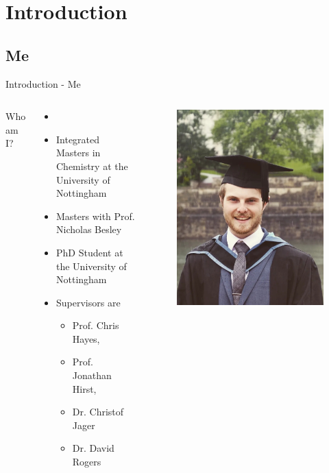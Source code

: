\section{Introduction}
\subsection{Me}
\begin{frame}{Introduction - Me}
\begin{columns}
Who am I?
\begin{itemize}
\item \insertauthor
\item Integrated Masters in Chemistry at the University of Nottingham
\item Masters with Prof. Nicholas Besley
\item PhD Student at the University of Nottingham
\item Supervisors are 
	\begin{itemize}
		\item Prof. Chris Hayes,
		\item Prof. Jonathan Hirst,
		\item Dr. Christof Jager
		\item Dr. David Rogers
	\end{itemize}
\end{itemize}
\begin{figure}
\includegraphics[height=0.8\textheight]{figures/Me/Graduation_Headshot.jpg}
\end{figure}


\end{columns}
\end{frame}
